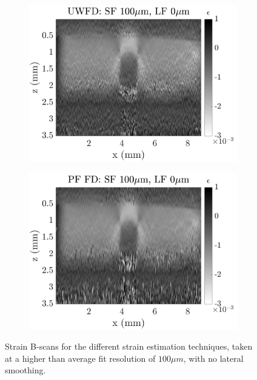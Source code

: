 \begin{figure}[h]
\begin{subfigure}{0.49\textwidth}
        \includegraphics[width=\textwidth]{appendix_figs/uwfd_fr100_lr0.png}
    \end{subfigure}
    \begin{subfigure}{0.49\textwidth}
    	\centering
        \includegraphics[width=\textwidth]{appendix_figs/pffd_fr100_lr0.png}
    \end{subfigure}    
    \caption{Strain B-scans for the different strain estimation techniques, taken at a higher than average fit resolution of $100\mu m$, with no lateral smoothing.}
	    \label{fr100_lr0}
\end{figure}


